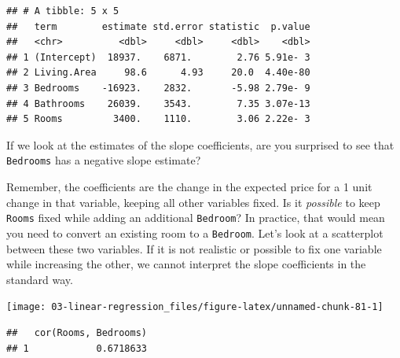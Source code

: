 \documentclass[
]{book}
\newenvironment{Shaded}{\begin{snugshade}}{\end{snugshade}}
\newcommand{\DataTypeTok}[1]{\textcolor[rgb]{0.13,0.29,0.53}{#1}}
\newcommand{\KeywordTok}[1]{\textcolor[rgb]{0.13,0.29,0.53}{\textbf{#1}}}
\newcommand{\NormalTok}[1]{#1}
\newcommand{\OperatorTok}[1]{\textcolor[rgb]{0.81,0.36,0.00}{\textbf{#1}}}
\newcommand{\StringTok}[1]{\textcolor[rgb]{0.31,0.60,0.02}{#1}}
\begin{document}
\begin{verbatim}
## # A tibble: 5 x 5
##   term        estimate std.error statistic  p.value
##   <chr>          <dbl>     <dbl>     <dbl>    <dbl>
## 1 (Intercept)  18937.    6871.        2.76 5.91e- 3
## 2 Living.Area     98.6      4.93     20.0  4.40e-80
## 3 Bedrooms    -16923.    2832.       -5.98 2.79e- 9
## 4 Bathrooms    26039.    3543.        7.35 3.07e-13
## 5 Rooms         3400.    1110.        3.06 2.22e- 3
\end{verbatim}

If we look at the estimates of the slope coefficients, are you surprised to see that \texttt{Bedrooms} has a negative slope estimate?

Remember, the coefficients are the change in the expected price for a 1 unit change in that variable, keeping all other variables fixed. Is it \emph{possible} to keep \texttt{Rooms} fixed while adding an additional \texttt{Bedroom}? In practice, that would mean you need to convert an existing room to a \texttt{Bedroom}. Let's look at a scatterplot between these two variables. If it is not realistic or possible to fix one variable while increasing the other, we cannot interpret the slope coefficients in the standard way.

\begin{Shaded}
\end{Shaded}

\begin{center}\texttt{[image: 03-linear-regression\_files/figure-latex/unnamed-chunk-81-1]} \end{center}

\begin{Shaded}
\end{Shaded}

\begin{verbatim}
##   cor(Rooms, Bedrooms)
## 1            0.6718633
\end{verbatim}
\end{document}
